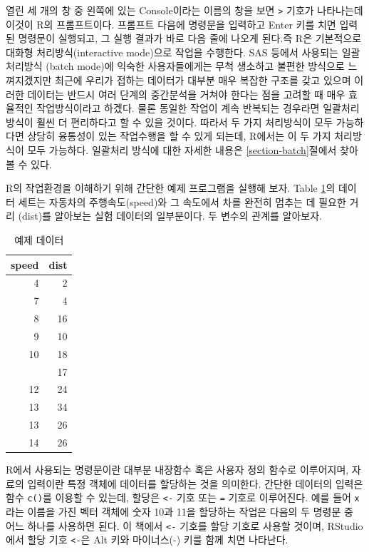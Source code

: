 \documentclass[
]{book}
\begin{document}
열린 세 개의 창 중 왼쪽에 있는 Console이라는 이름의 창을 보면 \texttt{\textgreater{}}
기호가 나타나는데 이것이 R의 프롬프트이다. 프롬프트 다음에 명령문을
입력하고 Enter 키를 치면 입력된 명령문이 실행되고, 그 실행 결과가 바로
다음 줄에 나오게 된다.즉 R은 기본적으로 대화형 처리방식(interactive
mode)으로 작업을 수행한다. SAS 등에서 사용되는 일괄처리방식 (batch
mode)에 익숙한 사용자들에게는 무척 생소하고 불편한 방식으로 느껴지겠지만
최근에 우리가 접하는 데이터가 대부분 매우 복잡한 구조를 갖고 있으며
이러한 데이터는 반드시 여러 단계의 중간분석을 거쳐야 한다는 점을 고려할
때 매우 효율적인 작업방식이라고 하겠다. 물론 동일한 작업이 계속
반복되는 경우라면 일괄처리방식이 훨씬 더 편리하다고 할 수 있을 것이다.
따라서 두 가지 처리방식이 모두 가능하다면 상당히 융통성이 있는
작업수행을 할 수 있게 되는데, R에서는 이 두 가지 처리방식이 모두
가능하다. 일괄처리 방식에 대한 자세한 내용은 \ref{section-batch}절에서
찾아볼 수 있다.

R의 작업환경을 이해하기 위해 간단한 예제 프로그램을 실행해 보자. Table
\ref{tab:exdata}의 데이터 세트는 자동차의 주행속도(speed)와 그 속도에서
차를 완전히 멈추는 데 필요한 거리 (dist)를 알아보는 실험 데이터의
일부분이다. 두 변수의 관계를 알아보자.

\begin{table}

\caption{\label{tab:exdata}예제 데이터}
\centering
\begin{tabular}[t]{rr}
\toprule
speed & dist\\
\midrule
4 & 2\\
7 & 4\\
8 & 16\\
9 & 10\\
10 & 18\\
\addlinespace
11 & 17\\
12 & 24\\
13 & 34\\
13 & 26\\
14 & 26\\
\bottomrule
\end{tabular}
\end{table}

R에서 사용되는 명령문이란 대부분 내장함수 혹은 사용자 정의 함수로
이루어지며, 자료의 입력이란 특정 객체에 데이터를 할당하는 것을 의미한다.
간단한 데이터의 입력은 함수 \texttt{c()}를 이용할 수 있는데, 할당은 \texttt{\textless{}-} 기호
또는 \texttt{=} 기호로 이루어진다. 예를 들어 \texttt{x}라는 이름을 가진 벡터 객체에 숫자
10과 11을 할당하는 작업은 다음의 두 명령문 중 어느 하나를 사용하면
된다. 이 책에서 \texttt{\textless{}-} 기호를 할당 기호로 사용할 것이며, RStudio에서 할당
기호 \texttt{\textless{}-}은 Alt 키와 마이너스(-) 키를 함께 치면 나타난다.
\end{document}
